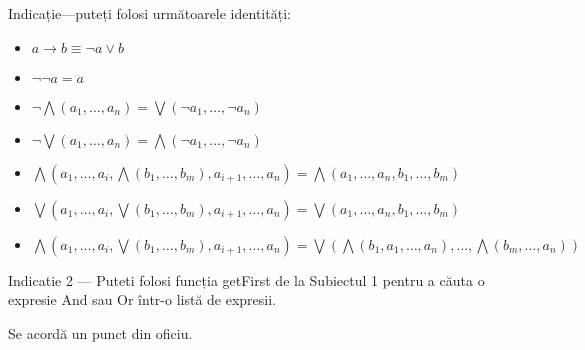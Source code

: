 \documentclass[addpoints,12pt,a4paper]{exam}
\begin{document}
\begin{questions}
Indicație---puteți folosi următoarele identități:
\begin{itemize}
\item $a \rightarrow b \equiv \neg a \vee b$
\item $\neg \neg a = a$
\item $\neg\bigwedge (a_1,\ldots,a_n) = \bigvee(\neg a_1,\ldots,\neg a_n)$
\item $\neg\bigvee (a_1,\ldots,a_n) = \bigwedge(\neg a_1,\ldots,\neg a_n)$
\item $\bigwedge{\left(a_1,\ldots,a_i,\bigwedge (b_1,\ldots,b_m),a_{i+1},\ldots,a_n\right)}
= \bigwedge (a_1,\ldots,a_n,b_1,\ldots,b_m)$
\item $\bigvee{\left(a_1,\ldots,a_i,\bigvee (b_1,\ldots,b_m),a_{i+1},\ldots,a_n\right)}
= \bigvee (a_1,\ldots,a_n,b_1,\ldots,b_m)$
\item $\bigwedge{\left(a_1,\ldots,a_i,\bigvee (b_1,\ldots,b_m),a_{i+1},\ldots,a_n\right)}
= \bigvee{\left(\bigwedge(b_1,a_1,\ldots,a_n),\ldots,\bigwedge(b_m,\ldots,a_n)\right)}$
\end{itemize}
Indicatie 2 --- Puteti folosi funcția getFirst de la Subiectul 1 pentru a căuta o expresie And sau Or într-o listă de expresii.

\end{questions}
Se acordă un punct din oficiu.
\end{document}

